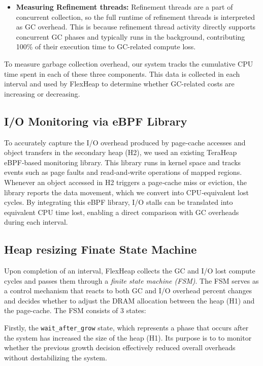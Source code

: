 \begin{itemize}
	\item \textbf{Measuring Refinement threads:} Refinement threads are a part of concurrent collection,
	      so the full runtime of refinement threads is interpreted as GC overhead. This is because refinement thread
	      activity directly supports concurrent GC phases and typically runs in the background,
	      contributing 100\% of their execution time to GC-related compute loss.

\end{itemize}

To measure garbage collection overhead, our system tracks the cumulative CPU time spent in each of these three components.
This data is collected in each interval and used by FlexHeap to determine whether GC-related costs are increasing or decreasing.

\subsection{I/O Monitoring via eBPF Library}

To accurately capture the I/O overhead produced by page‑cache accesses and
object transfers in the secondary heap (H2), we used an existing TeraHeap
eBPF‑based monitoring library. This library runs in kernel space and tracks
events such as page faults and read‑and‑write operations of mapped regions.
Whenever an object accessed in H2 triggers a page‑cache miss or eviction, the
library reports the data movement, which we convert into CPU‑equivalent lost
cycles. By integrating this eBPF library, I/O stalls can be translated into
equivalent CPU time lost, enabling a direct comparison with GC overheads during
each interval.

\subsection{Heap resizing Finate State Machine}

Upon completion of an interval, FlexHeap collects the GC and I/O lost compute cycles and passes them through
a \textit{finite state machine (FSM)}. The FSM serves as a control mechanism
that reacts to both GC and I/O overhead percent changes and decides whether to adjust the DRAM allocation
between the heap (H1) and the page-cache. The FSM consists of 3 states:

Firstly, the \texttt{wait\_after\_grow} state, which represents a phase that occurs after
the system has increased the size of the heap (H1). Its purpose is to
to monitor whether the previous growth decision effectively
reduced overall overheads without destabilizing the system.

